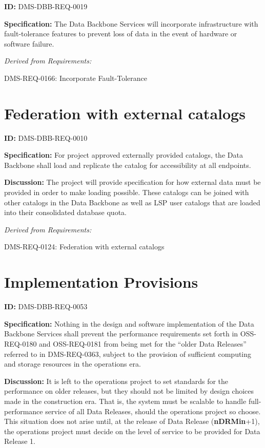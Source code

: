 \documentclass[SE,toc,lsstdraft]{lsstdoc}
\begin{document}
\label{DMS-DBB-REQ-0019}
\textbf{ID:} DMS-DBB-REQ-0019

\textbf{Specification:}
The Data Backbone Services will incorporate infrastructure with fault-tolerance features to prevent loss of data in the event of hardware or software failure.

\emph{Derived from Requirements:}

DMS-REQ-0166:
Incorporate Fault-Tolerance \newline

\section{Federation with external catalogs}

\label{DMS-DBB-REQ-0010}
\textbf{ID:} DMS-DBB-REQ-0010

\textbf{Specification:}
For project approved externally provided catalogs, the Data Backbone shall load and replicate the catalog for accessibility at all endpoints.

\textbf{Discussion:}
The project will provide specification for how external data must be provided in order to make loading possible.    These catalogs can be joined with other catalogs in the Data Backbone as well as LSP user catalogs that are loaded into their consolidated database quota.

\emph{Derived from Requirements:}

DMS-REQ-0124:
Federation with external catalogs \newline

\section{Implementation Provisions}

\label{DMS-DBB-REQ-0053}
\textbf{ID:} DMS-DBB-REQ-0053

\textbf{Specification:}
Nothing in the design and software implementation of the Data Backbone Services shall prevent the performance requirements set forth in OSS-REQ-0180 and OSS-REQ-0181 from being met for the “older Data Releases” referred to in DMS-REQ-0363, subject to the provision of sufficient computing and storage resources in the operations era.

\textbf{Discussion:}
It is left to the operations project to set standards for the performance on older releases, but they should not be limited by design choices made in the construction era. That is, the system must be scalable to handle full-performance service of all Data Releases, should the operations project so choose. This situation does not arise until, at the release of Data Release (\textbf{nDRMin}+1), the operations project must decide on the level of service to be provided for Data Release 1.
\end{document}
